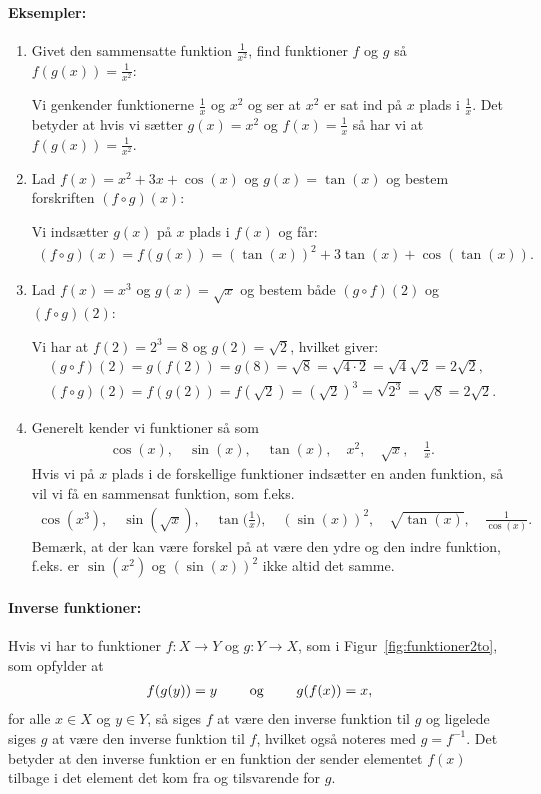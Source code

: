 \paragraph*{Eksempler:}
\begin{enumerate}
\item Givet den sammensatte funktion $\frac{1}{x^2}$, find funktioner $f$ og $g$ så $f(g(x))=\frac{1}{x^2}$:

Vi genkender funktionerne $\frac{1}{x}$ og $x^2$ og ser at $x^2$ er sat ind på $x$ plads i $\frac{1}{x}$. Det betyder at hvis vi sætter $g(x)=x^2$ og $f(x)=\frac{1}{x}$ så har vi at $f(g(x))=\frac{1}{x^2}$.
\item Lad $f(x) = x^2+3x + \cos(x)$ og $g(x) = \tan(x)$ og bestem forskriften $(f \circ g)(x)$:

Vi indsætter $g(x)$ på $x$ plads i $f(x)$ og får:
\begin{align*}
(f \circ g)(x) = f(g(x))= (\tan (x))^2 + 3\tan(x) + \cos(\tan(x)).
\end{align*} 
\item Lad $f (x) = x^3$ og $g(x) = \sqrt{x}$ og bestem både $(g \circ f)(2)$ og $(f \circ g)(2)$:

Vi har at $f(2)=2^3 = 8$ og $g(2)=\sqrt{2}$, hvilket giver:
\begin{align*}
(g \circ f) (2) = g(f(2)) = g(8)=\sqrt{8}=\sqrt{4 \cdot 2} = \sqrt{4}\sqrt{2} = 2\sqrt{2}, \\
(f \circ g)(2) = f(g(2)) = f(\sqrt{2}) = (\sqrt{2})^3 = \sqrt{2^3} = \sqrt{8} = 2\sqrt{2}.
\end{align*}
\item Generelt kender vi funktioner så som 
\begin{align*}
\cos (x), \quad \sin (x),\quad \tan (x),\quad  x^2,\quad  \sqrt{x},\quad  \frac{1}{x}.
\end{align*} 
Hvis vi på $x$ plads i de forskellige funktioner indsætter en anden funktion, så vil vi få en sammensat funktion, som f.eks.
\begin{align*}
\cos(x^3), \quad  \sin (\sqrt{x}), \quad  \tan \Big( \frac{1}{x} \Big),\quad  (\sin(x))^2, \quad  \sqrt{\tan(x)}, \quad  \frac{1}{\cos(x)}.
\end{align*}
Bemærk, at der kan være forskel på at være den ydre og den indre funktion, f.eks. er $\sin (x^2)$ og $(\sin (x))^2$ ikke altid det samme.
\end{enumerate}
\paragraph*{Inverse funktioner:}
Hvis vi har to funktioner $f \colon X \to Y$ og $g \colon Y \to X$, som i Figur~\ref{fig:funktioner2to}, som opfylder at 
\begin{align*}
f(g(y))=y \qquad \textup{ og } \qquad g(f(x))=x,
\end{align*}
for alle $x \in X$ og $y \in Y$, så siges $f$ at være den inverse funktion til $g$ og ligelede siges $g$ at være den inverse funktion til $f$, hvilket også noteres med $g=f^{-1}$. Det betyder at den inverse funktion er en funktion der sender elementet $f(x)$ tilbage i det element det kom fra og tilsvarende for $g$. 

